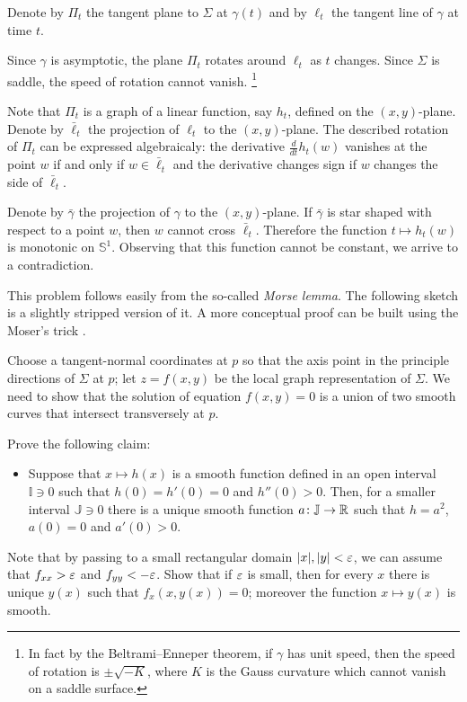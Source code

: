  Denote by $\Pi_t$ the tangent plane to $\Sigma$ at $\gamma(t)$ and by $\ell_t$ the tangent line of $\gamma$ at time $t$.

Since $\gamma$ is asymptotic, the plane $\Pi_t$ rotates around $\ell_t$ as $t$ changes.
Since $\Sigma$ is saddle, the speed of rotation cannot vanish.%
\footnote{In fact by the Beltrami--Enneper theorem, if $\gamma$ has unit speed, then the speed of rotation is $\pm\sqrt{-K}$, where $K$ is the Gauss curvature which cannot vanish on a saddle surface.}

Note that $\Pi_t$ is a graph of a linear function, say $h_t$, defined on the $(x, y)$-plane.
Denote by $\bar\ell_t$ the projection of $\ell_t$ to the $(x, y)$-plane.
The described rotation of $\Pi_t$ can be expressed algebraicaly:
the derivative $\tfrac{d}{dt}h_t(w)$ vanishes at the point $w$ if and only if $w\in \bar\ell_t$ 
and the derivative changes sign if $w$ changes the side of $\bar\ell_t$.

Denote by $\bar\gamma$ the projection of $\gamma$ to the $(x, y)$-plane.
If $\bar\gamma$ is star shaped with respect to a point $w$, then $w$ cannot cross $\bar\ell_t$.
Therefore the function $t\mapsto h_t(w)$ is monotonic on $\mathbb{S}^1$.
Observing that this function cannot be constant, we arrive to a contradiction.

This problem follows easily from the so-called \emph{Morse lemma}.
The following sketch is a slightly stripped version of it.
A more conceptual proof can be built using the Moser's trick \cite{palais}.

\medskip

Choose a tangent-normal coordinates at $p$ so that the axis point in the principle directions of $\Sigma$ at $p$;
let $z=f(x,y)$ be the local graph representation of $\Sigma$.
We need to show that the solution of equation $f(x,y)=0$ is a union of two smooth curves that intersect transversely at $p$.

Prove the following claim:
\begin{itemize}
 \item Suppose that  $x\mapsto h(x)$ is a smooth function defined in an open interval $\mathbb{I}\ni0$ such that $h(0)=h'(0)=0$ and $h''(0)>0$.
 Then, for a smaller interval $\mathbb{J}\ni0$ there is a unique smooth function $a\colon\mathbb{J}\to\mathbb{R}$ such that $h=a^2$, $a(0)=0$ and $a'(0)> 0$.
\end{itemize}
Note that by passing to a small rectangular domain $|x|,|y|<\varepsilon$, we can assume that $f_{xx}>\varepsilon$ and $f_{yy}<-\varepsilon$. 
Show that if $\varepsilon$ is small, then for every $x$ there is unique $y(x)$ such that $f_x(x,y(x))=0$; 
moreover the function $x\mapsto y(x)$ is smooth.

